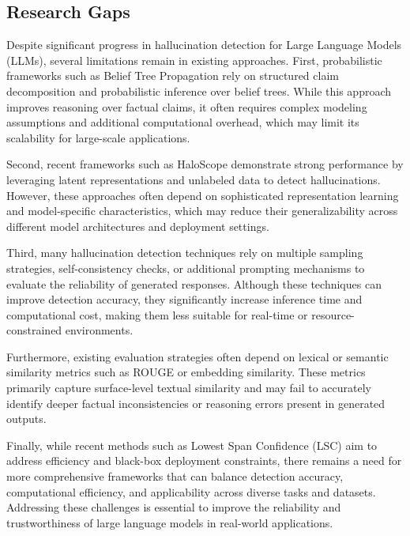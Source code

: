 \FloatBarrier
\subsection{Research Gaps}

Despite significant progress in hallucination detection for Large Language Models (LLMs), several limitations remain in existing approaches. First, probabilistic frameworks such as Belief Tree Propagation rely on structured claim decomposition and probabilistic inference over belief trees. While this approach improves reasoning over factual claims, it often requires complex modeling assumptions and additional computational overhead, which may limit its scalability for large-scale applications.

Second, recent frameworks such as HaloScope demonstrate strong performance by leveraging latent representations and unlabeled data to detect hallucinations. However, these approaches often depend on sophisticated representation learning and model-specific characteristics, which may reduce their generalizability across different model architectures and deployment settings.

Third, many hallucination detection techniques rely on multiple sampling strategies, self-consistency checks, or additional prompting mechanisms to evaluate the reliability of generated responses. Although these techniques can improve detection accuracy, they significantly increase inference time and computational cost, making them less suitable for real-time or resource-constrained environments.

Furthermore, existing evaluation strategies often depend on lexical or semantic similarity metrics such as ROUGE or embedding similarity. These metrics primarily capture surface-level textual similarity and may fail to accurately identify deeper factual inconsistencies or reasoning errors present in generated outputs.

Finally, while recent methods such as Lowest Span Confidence (LSC) aim to address efficiency and black-box deployment constraints, there remains a need for more comprehensive frameworks that can balance detection accuracy, computational efficiency, and applicability across diverse tasks and datasets. Addressing these challenges is essential to improve the reliability and trustworthiness of large language models in real-world applications.